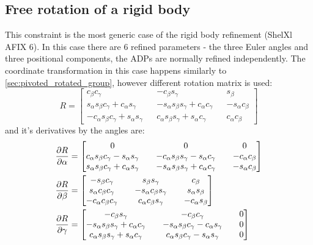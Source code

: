 \documentclass[pdf]{iucr}
\begin{document}
\subsection{Free rotation of a rigid body}
This constraint is the most generic case of the rigid body refinement (ShelXl AFIX 6). In this case there are 6 refined parameters - the three Euler angles and three positional components, the ADPs are normally refined independently. The coordinate transformation in this case happens similarly to \ref{sec:pivoted_rotated_group}, however different rotation matrix is used:
\begin{equation}
R = \begin{bmatrix} \label{eq:erm}
   c_\beta c_\gamma && - c_\beta s_\gamma &&  s_\beta \\
   s_\alpha s_\beta c_\gamma +  c_\alpha s_\gamma && - s_\alpha s_\beta s_\gamma+ c_\alpha c_\gamma && - s_\alpha c_\beta \\
  - c_\alpha s_\beta c_\gamma+ s_\alpha s_\gamma &&  c_\alpha s_\beta s_\gamma+ s_\alpha c_\gamma &&  c_\alpha c_\beta
\end{bmatrix}
\end{equation}
and it's derivatives by the angles are:
\begin{align}
\frac{\partial R}{\partial \alpha} &= \begin{bmatrix}
  0 && 0 && 0 \\
   c_\alpha s_\beta c_\gamma -  s_\alpha s_\gamma && - c_\alpha s_\beta s_\gamma- s_\alpha c_\gamma && - c_\alpha c_\beta \\
   s_\alpha s_\beta c_\gamma+ c_\alpha s_\gamma && - s_\alpha s_\beta s_\gamma+ c_\alpha c_\gamma && - s_\alpha c_\beta
\end{bmatrix}
\\
\frac{\partial R}{\partial \beta} &= \begin{bmatrix}
  - s_\beta c_\gamma &&  s_\beta s_\gamma &&  c_\beta \\
   s_\alpha c_\beta c_\gamma && - s_\alpha c_\beta s_\gamma &&  s_\alpha s_\beta \\
  - c_\alpha c_\beta c_\gamma &&  c_\alpha c_\beta s_\gamma && - c_\alpha s_\beta
\end{bmatrix}
\\
\frac{\partial R}{\partial \gamma} &= \begin{bmatrix}
  - c_\beta s_\gamma && - c_\beta c_\gamma && 0 \\
  - s_\alpha s_\beta s_\gamma +  c_\alpha c_\gamma && - s_\alpha s_\beta c_\gamma- c_\alpha s_\gamma && 0 \\
   c_\alpha s_\beta s_\gamma+ s_\alpha c_\gamma &&  c_\alpha s_\beta c_\gamma- s_\alpha s_\gamma && 0
\end{bmatrix}
\end{align}
\end{document}
